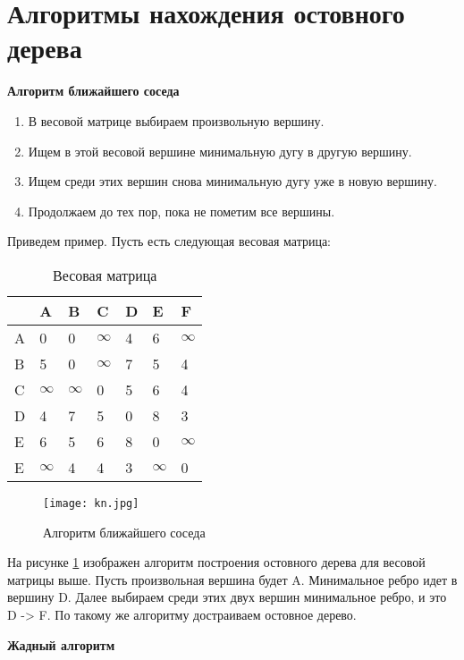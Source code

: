 \section{Алгоритмы нахождения остовного дерева}
\textbf{Алгоритм ближайшего соседа}
\begin{enumerate}
    \item В весовой матрице выбираем произвольную вершину.
    \item Ищем в этой весовой вершине минимальную дугу в другую вершину.
    \item Ищем среди этих вершин снова минимальную дугу уже в новую вершину.
    \item Продолжаем до тех пор, пока не пометим все вершины.
\end{enumerate}
Приведем пример. Пусть есть следующая весовая матрица:

\begin{table}[h]
    \centering
    \begin{tabular}[c]{ | l | l | l | l | l | l | l | }
        \hline
          & A & B & C & D & E & F \\ \hline
        A & 0 & 0 & $\infty$ & 4 & 6 & $\infty$ \\ \hline
        B & 5 & 0 & $\infty$ & 7 & 5 & 4\\ \hline
        C & $\infty$ & $\infty$ & 0 & 5 & 6 & 4 \\ \hline
        D & 4 & 7 & 5 & 0 & 8 & 3\\ \hline
        E & 6 & 5 & 6 & 8 & 0 & $\infty$\\ \hline
        E & $\infty$ & 4 & 4 & 3 & $\infty$ & 0 \\
        \hline
    \end{tabular}
    \caption{Весовая матрица}
\end{table}

\begin{figure}[!h]
    \centering 
    \texttt{[image: kn.jpg]}
    \caption{Алгоритм ближайшего соседа}
    \label{graph_kn}
\end{figure}

На рисунке \ref{graph_kn} изображен алгоритм построения остовного дерева для весовой матрицы выше. 
Пусть произвольная вершина будет A. Минимальное ребро идет в вершину D. 
Далее выбираем среди этих двух вершин минимальное ребро, и это D -> F. По такому же
алгоритму достраиваем остовное дерево.

\hspace{5mm}
\newpage
\textbf{Жадный алгоритм}

